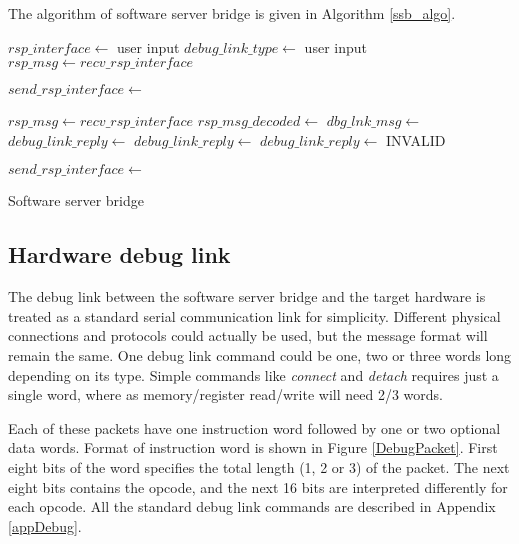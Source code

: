 The algorithm of software server bridge is given in Algorithm \ref{ssb_algo}.
\begin{algorithm}
	\begin{algorithmic}[1]
			\State $rsp\_interface \gets$ user input
			\State $debug\_link\_type \gets$ user input
			\State {}
			\State $rsp\_msg\gets recv\_rsp\_interface$	
		\EndWhile
		
		\State $send\_rsp\_interface \gets$  
		
			\State $rsp\_msg\gets recv\_rsp\_interface$
			\State $rsp\_msg\_decoded \gets$ 
				\State $dbg\_lnk\_msg \gets$ 
				\State $debug\_link\_reply \gets$ 
				\State $debug\_link\_reply \gets$ 
			\Else 
				\State $debug\_link\_reply \gets$ INVALID
			\EndIf
			
			\State $send\_rsp\_interface \gets $ 
		\EndWhile
		
		\EndFunction
	\end{algorithmic}
	\caption{Software server bridge}\label{ssb_algo}
\end{algorithm}

\subsection{Hardware debug link}
The debug link between the software server bridge and the target hardware is treated as a standard serial communication link for simplicity. Different physical connections and protocols could actually be used, but the message format will remain the same. One debug link command could be one, two or three words long depending on its type. Simple commands like \textit{connect} and \textit{detach} requires just a single word, where as memory/register read/write will need 2/3 words.

Each of these packets have one instruction word followed by one or two optional data words. Format of instruction word is shown in Figure \ref{DebugPacket}. First eight bits of the word specifies the total length (1, 2 or 3) of the packet. The next eight bits contains the opcode, and the next 16 bits are interpreted differently for each opcode. All the standard debug link commands are described in Appendix \ref{appDebug}.


